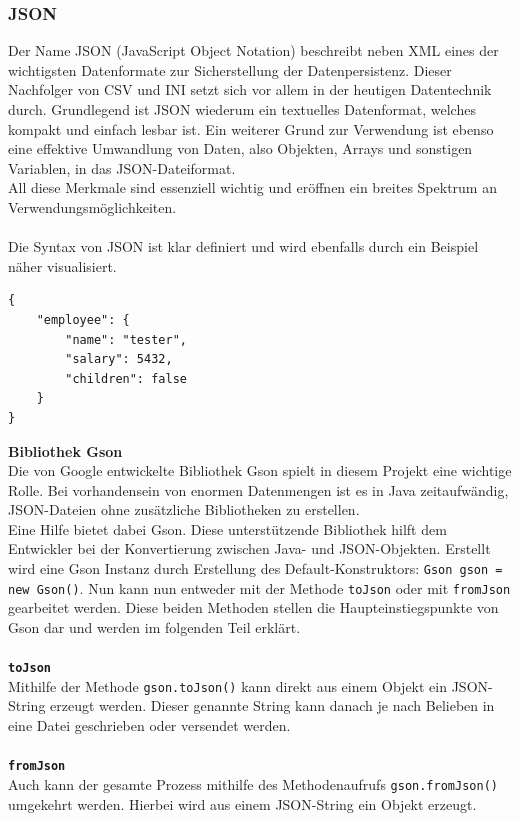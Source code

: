 \subsubsection{JSON}\label{sssec:json}
Der Name JSON (JavaScript Object Notation) beschreibt neben XML eines der wichtigsten Datenformate zur Sicherstellung der Datenpersistenz.
Dieser Nachfolger von \acs{CSV} und INI setzt sich vor allem in der heutigen Datentechnik durch.
Grundlegend ist JSON wiederum ein textuelles Datenformat, welches kompakt und einfach lesbar ist.
Ein weiterer Grund zur Verwendung ist ebenso eine effektive Umwandlung von Daten, also Objekten, Arrays und sonstigen Variablen, in das JSON-Dateiformat.\\
All diese Merkmale sind essenziell wichtig und eröffnen ein breites Spektrum an Verwendungsmöglichkeiten.\\\\
\newpage
Die Syntax von JSON ist klar definiert und wird ebenfalls durch ein Beispiel näher visualisiert.
\begin{lstlisting}[style=json, caption=JSON-Codebeispiel,label=jsonExample]
{
    "employee": {
        "name": "tester",
        "salary": 5432,
        "children": false
    }
}
\end{lstlisting}
\textbf{Bibliothek Gson}\\
Die von Google entwickelte Bibliothek Gson spielt in diesem Projekt eine wichtige Rolle.
Bei vorhandensein von enormen Datenmengen ist es in Java zeitaufwändig, JSON-Dateien ohne zusätzliche Bibliotheken zu erstellen.\\
Eine Hilfe bietet dabei Gson.
Diese unterstützende Bibliothek hilft dem Entwickler bei der Konvertierung zwischen Java- und JSON-Objekten.
Erstellt wird eine Gson Instanz durch Erstellung des Default-Konstruktors: \lstinline[style=java]{Gson gson = new Gson()}.
Nun kann nun entweder mit der Methode \lstinline{toJson} oder mit \lstinline{fromJson} gearbeitet werden.
Diese beiden Methoden stellen die Haupteinstiegspunkte von Gson dar und werden im folgenden Teil erklärt.
\\\\
\textbf{\lstinline{toJson}}
\\
Mithilfe der Methode \lstinline[style=java]{gson.toJson()} kann direkt aus einem Objekt ein JSON-String erzeugt werden.
Dieser genannte String kann danach je nach Belieben in eine Datei geschrieben oder versendet werden.
\\\\
\textbf{\lstinline{fromJson}}
\\
Auch kann der gesamte Prozess mithilfe des Methodenaufrufs \lstinline[style=java]{gson.fromJson()} umgekehrt werden.
Hierbei wird aus einem JSON-String ein Objekt erzeugt.
\newpage
